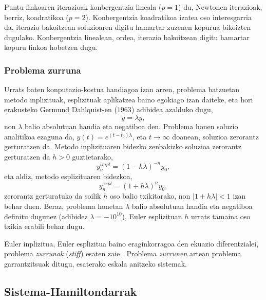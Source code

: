 Puntu-finkoaren iterazioak konbergentzia lineala ($p=1$) du, Newtonen iterazioak, berriz, koadratikoa ($p=2$). Konbergentzia koadratikoa izatea oso interesgarria da, iterazio bakoitzean soluzioaren digitu hamartar zuzenen kopurua bikoizten dugulako. Konbergentzia linealean, ordea, iterazio bakoitzean digitu hamartar kopuru finkoa hobetzen dugu. 
  
\subsubsection*{Problema zurruna}

Urrats baten konputazio-kostua handiagoa izan arren, problema batzuetan metodo inplizituak, esplizituak aplikatzea baino egokiago izan daiteke, eta hori erakusteko Germund Dahlquist-en ($1963$) adibidea azalduko dugu,
\begin{equation}
 \label{eq:202c}
\dot y=\lambda y,
\end{equation} 
non $\lambda$ balio absolutuan handia eta negatiboa den. Problema honen soluzio analitikoa ezaguna da, $y(t)=e^{(t-t_0)\lambda}$, eta $t \rightarrow \infty$ doanean, soluzioa zerorantz gerturatzen da. Metodo inplizituaren bidezko zenbakizko soluzioa zerorantz gerturatzen da $h>0$ guztietarako,
\begin{equation*}
y_n^{impl}=(1-h\lambda)^{-n} y_0,
\end{equation*}    
eta aldiz, metodo esplizituaren bidezkoa,
\begin{equation*}
y_n^{expl}=(1+h\lambda)^{n} y_0,
\end{equation*}    
zerorantz gerturatuko da soilik $h$ oso balio txikitarako, non $|1+h\lambda|<1$ izan behar duen. Beraz, problema honetan $\lambda$ balio absolutuan handia  eta negatiboa definitu dugunez (adibidez $\lambda=-10^{10}$), Euler esplizituan $h$ urrats tamaina oso txikia erabili behar dugu.    

Euler inplizitua, Euler esplizitua baino eraginkorragoa den ekuazio diferentzialei, problema \emph{zurrunak} (\emph{stiff}) esaten zaie \cite{Hairer2006}. Problema \emph{zurrunen} artean problema garrantzitsuak ditugu, esaterako eskala anitzeko sistemak. 

 

\subsection{Sistema-Hamiltondarrak}

